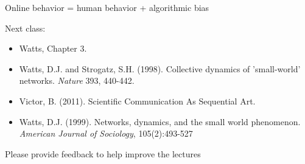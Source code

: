 \documentclass[aspectratio=169]{beamer}
\begin{document}
\begin{frame}

Online behavior = human behavior + algorithmic bias


\end{frame}
\begin{frame}

Next class:\\
\pause
\begin{itemize}
\item Watts, Chapter 3.
\item Watts, D.J. and Strogatz, S.H. (1998). Collective dynamics of 'small-world' networks. \textit{Nature} 393, 440-442.
\item Victor, B. (2011). Scientific Communication As Sequential Art.
\item Watts, D.J. (1999). Networks, dynamics, and the small world phenomenon. \textit{American Journal of Sociology}, 105(2):493-527
\end{itemize}

\end{frame}
\begin{frame}

Please provide feedback to help improve the lectures
\end{frame}
\end{document}
